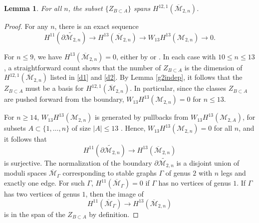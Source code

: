 \documentclass[12pt]{amsart}
\newtheorem{lem}[thm]{Lemma}
\theoremstyle{definition}
\numberwithin{equation}{section}
\newcommand{\M}{\mathcal{M}}
\renewcommand{\tilde}{\widetilde}
\newcommand{\Mb}{\overline{\M}}
\theoremstyle{definition} %
\theoremstyle{remark}
\begin{document}
\begin{lem} \label{g2span}
For all $n$, the subset $\{Z_{B \subset A}\}$ spans $H^{12,1}(\Mb_{2,n})$.
\end{lem}
\begin{proof}
For any $n$, there is an exact sequence
\[
H^{11}(\tilde{\partial \M_{2,n}})\rightarrow H^{13}(\Mb_{2,n})\rightarrow W_{13}H^{13}(\M_{2,n})\rightarrow 0.
\]

For $n \leq 9$, we have $H^{13}(\Mb_{2,n}) = 0$, either by \cite[Theorem 1.4]{CL-CKgP} or \cite{BergstromData}.
In each case with $10 \leq n \leq 13$, a straightforward count shows that the number of $Z_{B \subset A}$ is the dimension of $H^{12,1}(\Mb_{2,n})$ listed in \eqref{d1} and \eqref{d2}. By Lemma \ref{g2indep}, it follows that the $Z_{B \subset A}$ must be a basis for $H^{12,1}(\Mb_{2,n})$. In particular, since the classes $Z_{B\subset A}$ are pushed forward from the boundary, $W_{13}H^{13}(\M_{2,n}) = 0$ for $n \leq 13$.

For $n \geq 14$, $W_{13} H^{13}(\M_{2,n})$ is generated by pullbacks from $W_{13} H^{13}(\M_{2,A})$, for subsets $A \subset \{1, \ldots, n\}$ of size $|A|\leq 13$ \cite[Lemma 3.1(b)]{CLP-STE}. Hence, $W_{13}H^{13}(\M_{2,n}) = 0$ for all $n$, and it follows that
\[
H^{11}(\tilde{\partial \M_{2,n}})\rightarrow H^{13}(\Mb_{2,n})
\] is surjective. The normalization of the boundary $\tilde{\partial \M_{2,n}}$ is a disjoint union of moduli spaces $\Mb_{\Gamma}$ corresponding to stable graphs $\Gamma$ of genus $2$ with $n$ legs and exactly one edge. For such $\Gamma$, $H^{11}(\Mb_{\Gamma})=0$ if $\Gamma$ has no vertices of genus $1$. If $\Gamma$ has two vertices of genus $1$, then the image of 
\[
H^{11}(\Mb_{\Gamma})\rightarrow H^{13}(\Mb_{2,n})
\]
is in the span of the $Z_{B\subset A}$ by definition. 


\end{proof}
\end{document}
